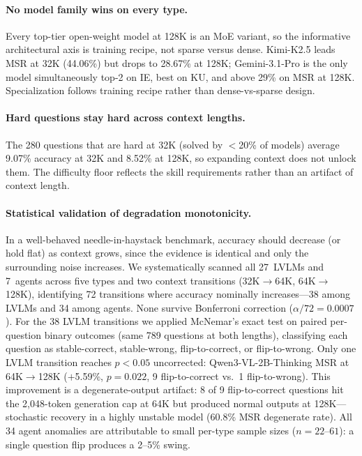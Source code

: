 \documentclass{article}
\begin{document}
\paragraph{No model family wins on every type.}
Every top-tier open-weight model at 128K is an MoE variant, so the informative architectural axis is training recipe, not sparse versus dense. Kimi-K2.5 leads MSR at 32K (44.06\%) but drops to 28.67\% at 128K; Gemini-3.1-Pro is the only model simultaneously top-2 on IE, best on KU, and above 29\% on MSR at 128K. Specialization follows training recipe rather than dense-vs-sparse design.

\paragraph{Hard questions stay hard across context lengths.}
The 280 questions that are hard at 32K (solved by $<$20\% of models) average 9.07\% accuracy at 32K and 8.52\% at 128K, so expanding context does not unlock them. The difficulty floor reflects the skill requirements rather than an artifact of context length.

\paragraph{Statistical validation of degradation monotonicity.}
In a well-behaved needle-in-haystack benchmark, accuracy should decrease (or hold flat) as context grows, since the evidence is identical and only the surrounding noise increases.
We systematically scanned all 27~LVLMs and 7~agents across five types and two context transitions (32K$\to$64K, 64K$\to$128K), identifying 72 transitions where accuracy nominally increases---38 among LVLMs and 34 among agents.
None survive Bonferroni correction ($\alpha/72 = 0.0007$).
For the 38 LVLM transitions we applied McNemar's exact test on paired per-question binary outcomes (same 789 questions at both lengths), classifying each question as stable-correct, stable-wrong, flip-to-correct, or flip-to-wrong.
Only one LVLM transition reaches $p < 0.05$ uncorrected: Qwen3-VL-2B-Thinking MSR at 64K$\to$128K ($+$5.59\%, $p=0.022$, 9 flip-to-correct vs.\ 1 flip-to-wrong).
This improvement is a degenerate-output artifact: 8 of 9 flip-to-correct questions hit the 2{,}048-token generation cap at 64K but produced normal outputs at 128K---stochastic recovery in a highly unstable model (60.8\% MSR degenerate rate).
All 34 agent anomalies are attributable to small per-type sample sizes ($n = 22$--$61$): a single question flip produces a 2--5\% swing.
\end{document}
